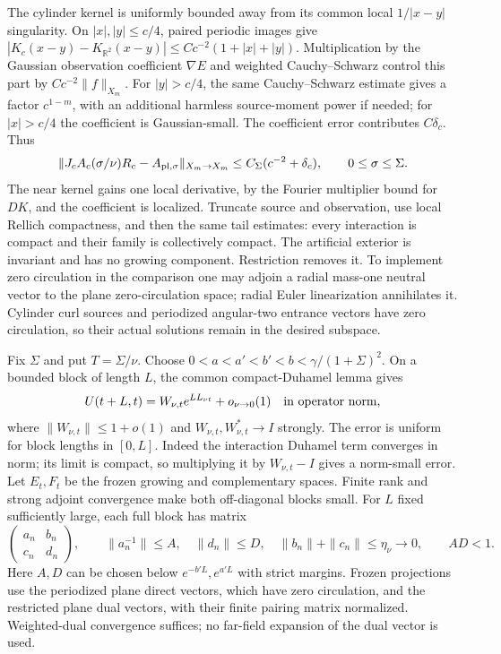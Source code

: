 The cylinder kernel is uniformly bounded away from its common local
$1/|x-y|$ singularity. On $|x|,|y|\le c/4$, paired periodic images
give
$|K_c(x-y)-K_{\mathbb R^2}(x-y)|
\le Cc^{-2}(1+|x|+|y|)$.
Multiplication by the Gaussian observation coefficient $\nabla E$
and weighted Cauchy--Schwarz control this part by $Cc^{-2}\|f\|_{X_m}$.
For $|y|>c/4$, the same Cauchy--Schwarz estimate gives a factor
$c^{1-m}$, with an additional harmless source-moment power if needed;
for $|x|>c/4$ the coefficient is Gaussian-small. The coefficient error
contributes $C\delta_c$. Thus
\begin{equation}
 \|J_cA_c(\sigma/\nu)R_c-A_{\rm pl,\sigma}\|_{X_m\to X_m}
 \le C_\Sigma(c^{-2}+\delta_c),\qquad 0\le\sigma\le\Sigma.
 \label{short-bg:interaction-cylinder}
\end{equation}
The near kernel gains one local derivative, by the Fourier multiplier
bound for $DK$, and the coefficient is localized. Truncate source and
observation, use local Rellich compactness, and then the same tail
estimates: every interaction is compact and their family is
collectively compact. The artificial exterior is invariant and has no
growing component. Restriction removes it. To implement zero
circulation in the comparison one may adjoin a radial mass-one
neutral vector to the plane zero-circulation space; radial Euler
linearization annihilates it. Cylinder curl sources and periodized
angular-two entrance vectors have zero circulation, so their actual
solutions remain in the desired subspace.

Fix $\Sigma$ and put $T=\Sigma/\nu$. Choose
$0<a<a'<b'<b<\gamma/(1+\Sigma)^2$. On a bounded block of length $L$,
the common compact-Duhamel lemma gives
\[
 U(t+L,t)=W_{\nu,t}e^{L L_{\nu t}}+o_{\nu\to0}(1)
 \quad\hbox{in operator norm},
\]
where $\|W_{\nu,t}\|\le1+o(1)$ and $W_{\nu,t},W_{\nu,t}^*\to I$
strongly. The error is uniform for block lengths in $[0,L]$.
Indeed the interaction Duhamel term converges in norm; its limit is
compact, so multiplying it by $W_{\nu,t}-I$ gives a norm-small error.
Let $E_t,F_t$ be the frozen growing and complementary spaces. Finite
rank and strong adjoint convergence make both off-diagonal blocks
small. For $L$ fixed sufficiently large, each full block has matrix
\[
 \begin{pmatrix}a_n&b_n\\c_n&d_n\end{pmatrix},\qquad
 \|a_n^{-1}\|\le A,\quad \|d_n\|\le D,\quad
 \|b_n\|+\|c_n\|\le\eta_\nu\longrightarrow0,
 \qquad AD<1.
\]
Here $A,D$ can be chosen below $e^{-b'L},e^{a'L}$ with strict
margins. Frozen projections use the periodized plane direct vectors,
which have zero circulation, and the restricted plane dual vectors,
with their finite pairing matrix normalized. Weighted-dual convergence
suffices; no far-field expansion of
the dual vector is used.

